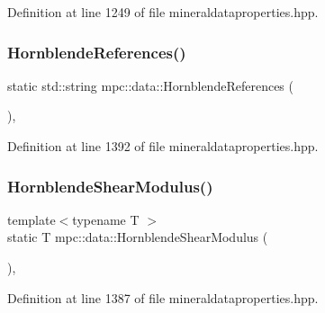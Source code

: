 Definition at line 1249 of file mineraldataproperties.\+hpp.

\mbox{\label{namespacempc_1_1data_a89ebcb7bd821af1b5628166d84e835c0}} 
\subsubsection{\texorpdfstring{Hornblende\+References()}{HornblendeReferences()}}
{\footnotesize\ttfamily static std\+::string mpc\+::data\+::\+Hornblende\+References (\begin{DoxyParamCaption}{ }\end{DoxyParamCaption})\hspace{0.3cm}{\ttfamily [inline]}, {\ttfamily [static]}}



Definition at line 1392 of file mineraldataproperties.\+hpp.

\mbox{\label{namespacempc_1_1data_aae71d499b1bca11ddede811581172401}} 
\subsubsection{\texorpdfstring{Hornblende\+Shear\+Modulus()}{HornblendeShearModulus()}}
{\footnotesize\ttfamily template$<$typename T $>$ \\
static T mpc\+::data\+::\+Hornblende\+Shear\+Modulus (\begin{DoxyParamCaption}{ }\end{DoxyParamCaption})\hspace{0.3cm}{\ttfamily [inline]}, {\ttfamily [static]}}



Definition at line 1387 of file mineraldataproperties.\+hpp.

\mbox{\label{namespacempc_1_1data_a19442c5f8b73475056c20bea55689213}} 
